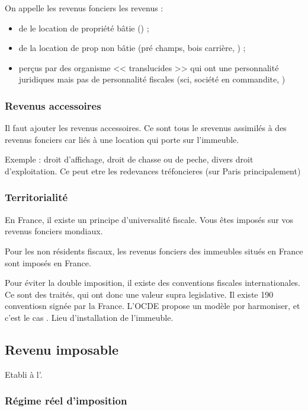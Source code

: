 				On appelle les revenus fonciers les revenus :
				\begin{itemize}
					\item de le location de propriété bâtie (\etc) ;
					\item de la location de prop non bâtie (pré champs, bois carrière, \etc) ;
					\item perçus par des organisme << translucides >> qui ont une personnalité juridiques mais pas de personnalité fiscales (sci, société en commandite, \etc)
				\end{itemize}

			\subsubsection{Revenus accessoires}

				Il faut ajouter les revenus accessoires. Ce sont tous le srevenus assimilés à des revenus fonciers car liés à une location qui porte sur l'immeuble.

				Exemple : droit d'affichage, droit de chasse ou de peche, divers droit d'exploitation. Ce peut etre les redevances tréfoncieres (sur Paris principalement)

			\subsubsection{Territorialité}

				En France, il existe un principe d'universalité fiscale. Vous êtes imposés sur vos revenus fonciers mondiaux.

				Pour les non résidents fiscaux, les revenus fonciers des immeubles situés en France sont imposés en France.

				Pour éviter la double imposition, il existe des conventions fiscales internationales. Ce sont des traités, qui ont donc une valeur supra legislative. Il existe 190 conventiosn signée par la France. L'OCDE propose un modèle por harmoniser, et c'est le cas . Lieu d'installation de l'immeuble.

	\subsection{Revenu imposable}

		Etabli à l'.

		\subsubsection{Régime réel d'imposition}

